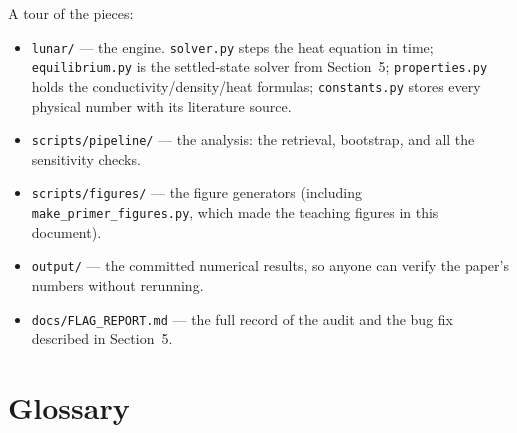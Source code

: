 \documentclass[11pt]{article}
\begin{document}
\noindent A tour of the pieces:
\begin{itemize}
\item \texttt{lunar/} --- the engine. \texttt{solver.py} steps the heat
      equation in time; \texttt{equilibrium.py} is the settled-state
      solver from Section~5; \texttt{properties.py} holds the
      conductivity/density/heat formulas; \texttt{constants.py} stores
      every physical number with its literature source.
\item \texttt{scripts/pipeline/} --- the analysis: the retrieval,
      bootstrap, and all the sensitivity checks.
\item \texttt{scripts/figures/} --- the figure generators (including
      \texttt{make\_primer\_figures.py}, which made the teaching figures
      in this document).
\item \texttt{output/} --- the committed numerical results, so anyone can
      verify the paper's numbers without rerunning.
\item \texttt{docs/FLAG\_REPORT.md} --- the full record of the audit and
      the bug fix described in Section~5.
\end{itemize}

\section*{Glossary}
\end{document}
